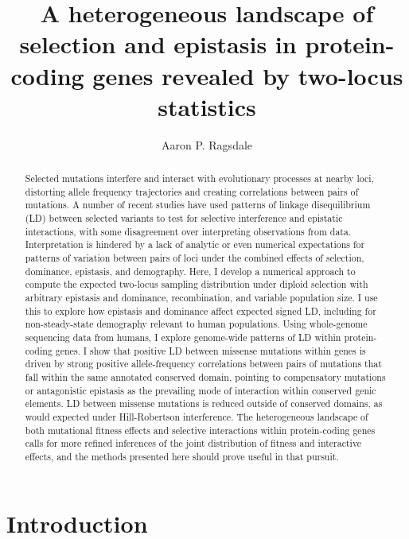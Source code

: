 \documentclass[]{article}
\begin{document}
\title{A heterogeneous landscape of selection and epistasis in protein-coding genes revealed by two-locus statistics}
\author[]{Aaron P. Ragsdale}
\maketitle


\begin{abstract}

Selected mutations interfere and interact with evolutionary processes at nearby
loci, distorting allele frequency trajectories and creating correlations
between pairs of mutations. A number of recent studies have used patterns of
linkage disequilibrium (LD) between selected variants to test for selective
interference and epistatic interactions, with some disagreement over
interpreting observations from data. Interpretation is hindered by a lack of
analytic or even numerical expectations for patterns of variation between pairs
of loci under the combined effects of selection, dominance, epistasis, and
demography. Here, I develop a numerical approach to compute the expected
two-locus sampling distribution under diploid selection with arbitrary
epistasis and dominance, recombination, and variable population size. I use
this to explore how epistasis and dominance affect expected signed LD,
including for non-steady-state demography relevant to human populations. Using
whole-genome sequencing data from humans, I explore genome-wide patterns of LD
within protein-coding genes. I show that positive LD between missense mutations
within genes is driven by strong positive allele-frequency correlations between
pairs of mutations that fall within the same annotated conserved domain,
pointing to compensatory mutations or antagonistic epistasis as the prevailing
mode of interaction within conserved genic elements. LD between missense
mutations is reduced outside of conserved domains, as would expected under
Hill-Robertson interference. The heterogeneous landscape of both mutational
fitness effects and selective interactions within protein-coding genes calls
for more refined inferences of the joint distribution of fitness and
interactive effects, and the methods presented here should prove useful in that
pursuit.

\end{abstract}

\section{Introduction}\label{sec:introduction}
\end{document}
